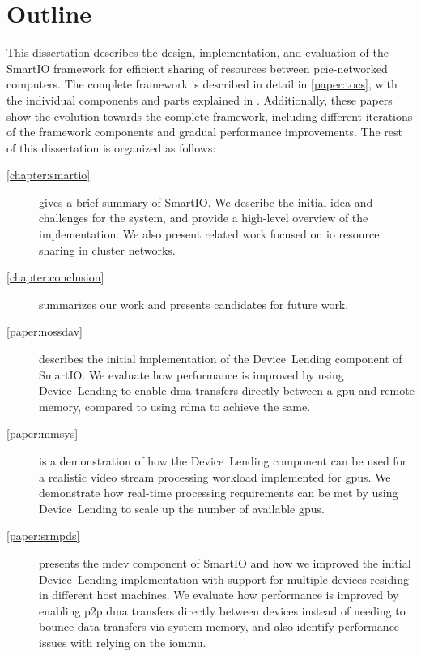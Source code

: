 \section{Outline}
This dissertation describes the design, implementation, and evaluation of the SmartIO framework for efficient sharing of resources between \gls{pcie}-networked computers.
%
The complete framework is described in detail in \cref{paper:tocs}, with the individual components and parts explained in .
%
Additionally, these papers show the evolution towards the complete framework, including different iterations of the framework components and gradual performance improvements.
%
The rest of this dissertation is organized as follows:
%
\begin{description}
    \item[\cref{chapter:smartio}]
        gives a brief summary of SmartIO.
        We describe the initial idea and challenges for the system, and provide a high-level overview of the implementation.
        We also present related work focused on \gls{io} resource sharing in cluster networks.

    \item[\cref{chapter:conclusion}]
        summarizes our work and presents candidates for future work.

    \item[\cref{paper:nossdav}]
        describes the initial implementation of the Device~Lending component of SmartIO.
        We evaluate how performance is improved by using Device~Lending to enable \gls{dma} transfers directly between a \gls{gpu} and remote memory, compared to using \gls{rdma} to achieve the same.

    \item[\cref{paper:mmsys}]
        is a demonstration of how the Device~Lending component can be used for a realistic video stream processing workload implemented for \glspl{gpu}.
        We demonstrate how real-time processing requirements can be met by using Device~Lending to scale up the number of available \glspl{gpu}.

    \item[\cref{paper:srmpds}]
        presents the \gls{mdev} component of SmartIO and how we improved the initial Device~Lending implementation with support for multiple devices residing in different host machines. 
        We evaluate how performance is improved by enabling \gls{p2p} \gls{dma} transfers directly between devices instead of needing to bounce data transfers via system memory, and also identify performance issues with relying on the \gls{iommu}.


\end{description}

